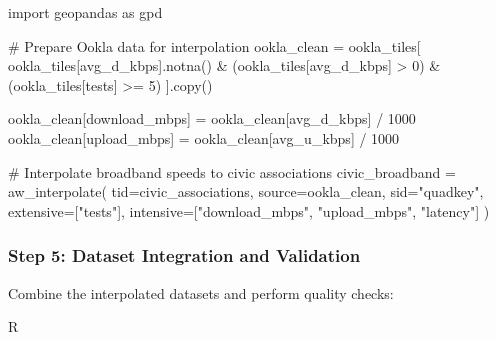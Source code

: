 \documentclass[
  letterpaper,
  DIV=11,
  numbers=noendperiod]{scrartcl}
\newenvironment{Shaded}{\begin{snugshade}}{\end{snugshade}}
\newcommand{\CommentTok}[1]{\textcolor[rgb]{0.37,0.37,0.37}{#1}}
\newcommand{\DecValTok}[1]{\textcolor[rgb]{0.68,0.00,0.00}{#1}}
\newcommand{\ImportTok}[1]{\textcolor[rgb]{0.00,0.46,0.62}{#1}}
\newcommand{\NormalTok}[1]{\textcolor[rgb]{0.00,0.23,0.31}{#1}}
\newcommand{\OperatorTok}[1]{\textcolor[rgb]{0.37,0.37,0.37}{#1}}
\newcommand{\StringTok}[1]{\textcolor[rgb]{0.13,0.47,0.30}{#1}}
\begin{document}
\begin{Shaded}
\begin{Highlighting}[]
\ImportTok{import}\NormalTok{ geopandas }\ImportTok{as}\NormalTok{ gpd}

\CommentTok{\# Prepare Ookla data for interpolation}
\NormalTok{ookla\_clean }\OperatorTok{=}\NormalTok{ ookla\_tiles[}
\NormalTok{    ookla\_tiles[}\StringTok{\textquotesingle{}avg\_d\_kbps\textquotesingle{}}\NormalTok{].notna() }\OperatorTok{\&} 
\NormalTok{    (ookla\_tiles[}\StringTok{\textquotesingle{}avg\_d\_kbps\textquotesingle{}}\NormalTok{] }\OperatorTok{\textgreater{}} \DecValTok{0}\NormalTok{) }\OperatorTok{\&} 
\NormalTok{    (ookla\_tiles[}\StringTok{\textquotesingle{}tests\textquotesingle{}}\NormalTok{] }\OperatorTok{\textgreater{}=} \DecValTok{5}\NormalTok{)}
\NormalTok{].copy()}

\NormalTok{ookla\_clean[}\StringTok{\textquotesingle{}download\_mbps\textquotesingle{}}\NormalTok{] }\OperatorTok{=}\NormalTok{ ookla\_clean[}\StringTok{\textquotesingle{}avg\_d\_kbps\textquotesingle{}}\NormalTok{] }\OperatorTok{/} \DecValTok{1000}
\NormalTok{ookla\_clean[}\StringTok{\textquotesingle{}upload\_mbps\textquotesingle{}}\NormalTok{] }\OperatorTok{=}\NormalTok{ ookla\_clean[}\StringTok{\textquotesingle{}avg\_u\_kbps\textquotesingle{}}\NormalTok{] }\OperatorTok{/} \DecValTok{1000}

\CommentTok{\# Interpolate broadband speeds to civic associations}
\NormalTok{civic\_broadband }\OperatorTok{=}\NormalTok{ aw\_interpolate(}
\NormalTok{    tid}\OperatorTok{=}\NormalTok{civic\_associations,}
\NormalTok{    source}\OperatorTok{=}\NormalTok{ookla\_clean,}
\NormalTok{    sid}\OperatorTok{=}\StringTok{"quadkey"}\NormalTok{,}
\NormalTok{    extensive}\OperatorTok{=}\NormalTok{[}\StringTok{"tests"}\NormalTok{],}
\NormalTok{    intensive}\OperatorTok{=}\NormalTok{[}\StringTok{"download\_mbps"}\NormalTok{, }\StringTok{"upload\_mbps"}\NormalTok{, }\StringTok{"latency"}\NormalTok{]}
\NormalTok{)}
\end{Highlighting}
\end{Shaded}

\subsubsection{Step 5: Dataset Integration and
Validation}\label{step-5-dataset-integration-and-validation}

Combine the interpolated datasets and perform quality checks:

R
\end{document}
